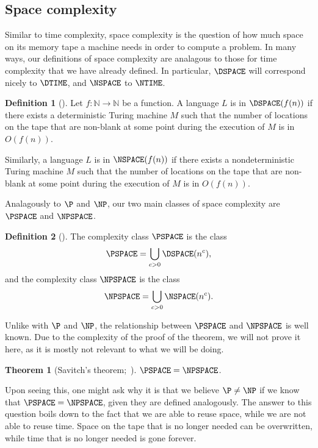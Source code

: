 \documentclass[english,12pt]{reedthesis}
\theoremstyle{plain}
\newtheorem{thm}{Theorem}[section]
\theoremstyle{definition}
\newtheorem{defn}[defn]{Definition}
\theoremstyle{remark}
\begin{document}
\subsection{Space complexity}

Similar to time complexity, space complexity is the question of how much space
on its memory tape a machine needs in order to compute a problem. In many ways,
our definitions of space complexity are analagous to those for time complexity
that we have already defined. In particular, $\DSPACE$ will correspond nicely to
$\DTIME$, and $\NSPACE$ to $\NTIME$.

\begin{defn}[{\cite[Def.\ 4.1]{AB09}}]%
  \label{def:dspace-nspace}
  Let $f\colon \mathbb{N} \rightarrow \mathbb{N}$ be a function. A language $L$ is in $\DSPACE(f(n))$ if
  there exists a deterministic Turing machine $M$ such that the number of
  locations on the tape that are non-blank at some point during the execution of
  $M$ is in $O(f(n))$.

  Similarly, a language $L$ is in $\NSPACE(f(n))$ if there exists a
  nondeterministic Turing machine $M$ such that the number of locations on the
  tape that are non-blank at some point during the execution of $M$ is in
  $O(f(n))$.
\end{defn}

Analagously to $\P$ and $\NP$, our two main classes of space complexity are
$\PSPACE$ and $\NPSPACE$.

\begin{defn}[{\cite[Def.\ 4.5]{AB09}}]%
  \label{def:pspace-npspace}
  The complexity class $\PSPACE$ is the class
  \[
    \PSPACE = \bigcup_{c > 0}\DSPACE(n^{c}),
  \]
  and the complexity class $\NPSPACE$ is the class
  \[
    \NPSPACE = \bigcup_{c > 0}\NSPACE(n^{c}).
  \]
\end{defn}

Unlike with $\P$ and $\NP$, the relationship between $\PSPACE$ and $\NPSPACE$ is
well known. Due to the complexity of the proof of the theorem, we will not prove
it here, as it is mostly not relevant to what we will be doing.

\begin{thm}[{Savitch's theorem;~\cite{Sav70}}]\label{thm:savitch}
  $\PSPACE = \NPSPACE$.
\end{thm}

Upon seeing this, one might ask why it is that we believe $\P \ne \NP$ if we know
that $\PSPACE = \NPSPACE$, given they are defined analogously. The answer to
this question boils down to the fact that we are able to reuse space, while we
are not able to reuse time. Space on the tape that is no longer needed can be
overwritten, while time that is no longer needed is gone forever.
\end{document}
